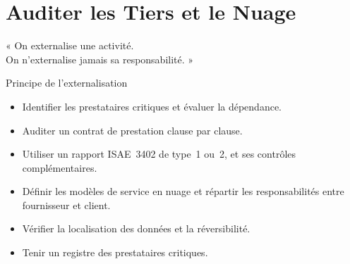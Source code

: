 
\chapter{Auditer les Tiers et le Nuage}
\label{chap:audit-tiers}

\epigraph{%
    « On externalise une activité.\\
    On n'externalise jamais sa responsabilité. »%
}{Principe de l'externalisation}


\begin{boxobjectifs}
\begin{itemize}
    \item Identifier les prestataires critiques et évaluer la dépendance.
    \item Auditer un contrat de prestation clause par clause.
    \item Utiliser un rapport ISAE~3402 de type~1 ou~2, et ses contrôles
          complémentaires.
    \item Définir les modèles de service en nuage et répartir les
          responsabilités entre fournisseur et client.
    \item Vérifier la localisation des données et la réversibilité.
    \item Tenir un registre des prestataires critiques.
\end{itemize}
\end{boxobjectifs}

